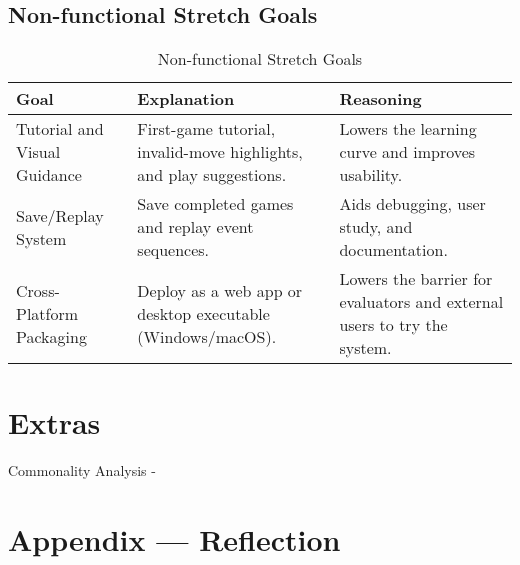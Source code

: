 \documentclass{article}
\begin{document}
    \subsection{Non-functional Stretch Goals}
    \begin{table}[H]
        \caption{Non-functional Stretch Goals}\label{TblStretchNonFunctionalGoals}
        \begin{tabular}{|p{}|p{}|p{}|}
            \hline
            \textbf{Goal} & \textbf{Explanation} & \textbf{Reasoning} \\
            \hline
            Tutorial and Visual Guidance &
            First-game tutorial, invalid-move highlights, and play suggestions. &
            Lowers the learning curve and improves usability. \\
            \hline
            Save/Replay System &
            Save completed games and replay event sequences. &
            Aids debugging, user study, and documentation. \\
            \hline
            Cross-Platform Packaging &
            Deploy as a web app or desktop executable (Windows/macOS). &
            Lowers the barrier for evaluators and external users to try the system. \\
            \hline
        \end{tabular}
    \end{table}

    \section{Extras}
    Commonality Analysis - 


    \newpage{}
    \section*{Appendix --- Reflection}
\end{document}
